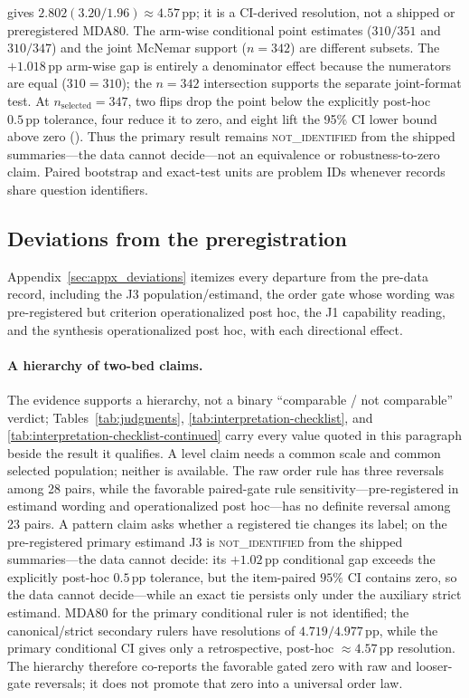 \documentclass{article}
\newcommand{\pp}{\,\mathrm{pp}}
\begin{document}
\begin{table}[!t]
{gives $2.802(3.20/1.96)\approx4.57\pp$; it is a CI-derived resolution, not a
shipped or preregistered MDA80.  The arm-wise conditional point estimates
($310/351$ and $310/347$) and the joint McNemar support ($n=342$) are different
subsets.  The $+1.018\pp$ arm-wise gap is entirely a denominator effect because
the numerators are equal ($310=310$); the $n=342$ intersection supports the
separate joint-format test.  At $n_{\mathrm{selected}}=347$, two
flips drop the point below the explicitly post-hoc $0.5\pp$ tolerance, four
reduce it to zero, and eight lift the 95\% CI lower bound above zero
(\protect{}).  Thus the primary result remains
\textsc{not\_identified} from the shipped summaries---the data cannot
decide---not an equivalence or robustness-to-zero claim.
Paired bootstrap and exact-test units are problem IDs whenever records share
question identifiers.}
\label{tab:j3-estimands}
\end{table}

\subsection{Deviations from the preregistration}\label{sec:deviations}

Appendix~\ref{sec:appx_deviations} itemizes every departure from the pre-data
record, including the J3 population/estimand, the order gate whose wording was
pre-registered but criterion operationalized post hoc, the J1 capability
reading, and the synthesis operationalized post hoc, with each directional
effect.

\paragraph{A hierarchy of two-bed claims.}
The evidence supports a hierarchy, not a binary ``comparable / not
comparable'' verdict; Tables~\ref{tab:judgments},
\ref{tab:interpretation-checklist}, and
\ref{tab:interpretation-checklist-continued} carry every value quoted in this
paragraph beside the result it qualifies.  A level claim needs a common scale
and common selected
population; neither is available.  The raw order rule has three reversals among
28 pairs, while the favorable paired-gate rule sensitivity---pre-registered
in estimand wording and operationalized post hoc---has no definite reversal
among 23
pairs.  A pattern claim asks whether a registered tie changes its label;
on the pre-registered primary estimand J3 is \textsc{not\_identified} from the
shipped summaries---the data cannot decide: its
$+1.02\pp$ conditional gap exceeds the explicitly post-hoc $0.5\pp$ tolerance,
but the item-paired
$95\%$ CI contains zero, so the data cannot decide---while an exact tie
persists only under the auxiliary strict estimand.  MDA80 for the primary
conditional ruler is not identified; the canonical/strict secondary rulers
have resolutions of $4.719/4.977\pp$, while the primary conditional CI gives
only a retrospective, post-hoc $\approx4.57\pp$ resolution.  The hierarchy
therefore co-reports the favorable gated zero with raw and looser-gate
reversals; it does not promote that zero into a universal order law.
\end{document}
